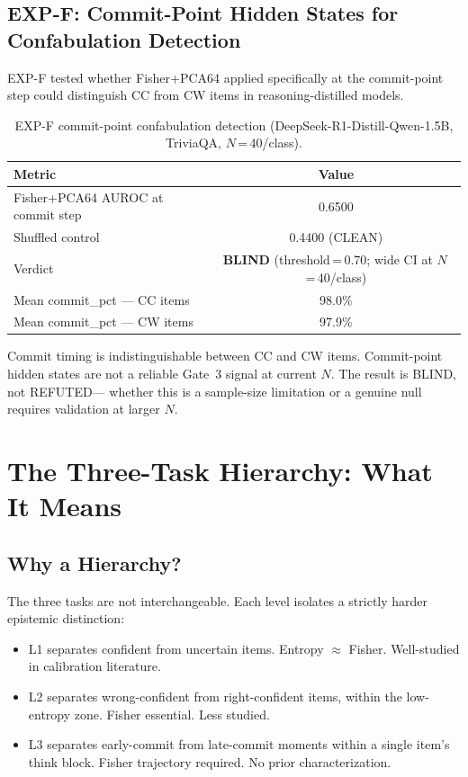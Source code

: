 \documentclass[11pt]{article}
\begin{document}
\subsection{EXP-F: Commit-Point Hidden States for Confabulation Detection}

EXP-F tested whether Fisher+PCA64 applied specifically at the commit-point step could
distinguish CC from CW items in reasoning-distilled models.

\begin{table}[h!]
\centering
\caption{EXP-F commit-point confabulation detection (DeepSeek-R1-Distill-Qwen-1.5B,
  TriviaQA, $N$\,=\,40/class).}
\begin{tabular}{lc}
\toprule
Metric & Value \\
\midrule
Fisher+PCA64 AUROC at commit step & 0.6500 \\
Shuffled control & 0.4400 (CLEAN) \\
Verdict & \textbf{BLIND} (threshold\,=\,0.70; wide CI at $N$\,=\,40/class) \\
Mean commit\_pct --- CC items & 98.0\% \\
Mean commit\_pct --- CW items & 97.9\% \\
\bottomrule
\end{tabular}
\end{table}

Commit timing is indistinguishable between CC and CW items. Commit-point hidden states
are not a reliable Gate~3 signal at current $N$. The result is BLIND, not REFUTED---
whether this is a sample-size limitation or a genuine null requires validation at
larger $N$.

\section{The Three-Task Hierarchy: What It Means}
\label{sec:hierarchy}

\subsection{Why a Hierarchy?}

The three tasks are not interchangeable. Each level isolates a strictly harder epistemic
distinction:

\begin{itemize}[leftmargin=2em]
\item L1 separates confident from uncertain items. Entropy $\approx$ Fisher.
  Well-studied in calibration literature.
\item L2 separates wrong-confident from right-confident items, within the low-entropy
  zone. Fisher essential. Less studied.
\item L3 separates early-commit from late-commit moments within a single item's think
  block. Fisher trajectory required. No prior characterization.
\end{itemize}
\end{document}
